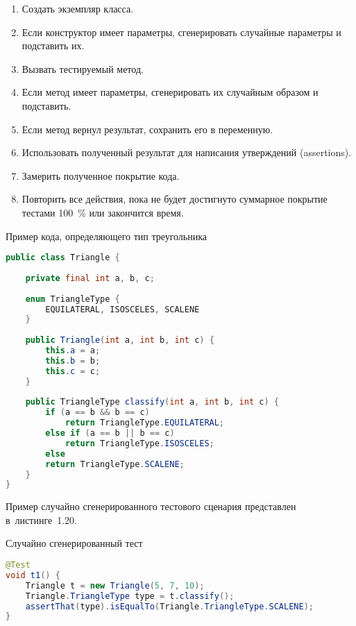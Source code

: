  \begin{enumerate}
 	\item Создать экземпляр класса.
 	\item Если конструктор имеет параметры, сгенерировать случайные параметры и подставить их.
 	\item Вызвать тестируемый метод.
 	\item Если метод имеет параметры, сгенерировать их случайным образом и подставить.
 	\item Если метод вернул результат, сохранить его в переменную.
 	\item Использовать полученный результат для написания утверждений (assertions).
 	\item Замерить полученное покрытие кода.
 	\item Повторить все действия, пока не будет достигнуто суммарное покрытие тестами 100~\% или закончится время.
 \end{enumerate}

\begin{ListingEnv}[!h]%
	\captiondelim{ } %
	\caption{Пример кода, определяющего тип треугольника}
	\begin{lstlisting}[language={Java}]
public class Triangle {
	
	private final int a, b, c;
	
	enum TriangleType {
		EQUILATERAL, ISOSCELES, SCALENE
	}
	
	public Triangle(int a, int b, int c) {
		this.a = a;
		this.b = b;
		this.c = c;
	}
	
	public TriangleType classify(int a, int b, int c) {
		if (a == b && b == c)
			return TriangleType.EQUILATERAL;
		else if (a == b || b == c)
			return TriangleType.ISOSCELES;
		else
		return TriangleType.SCALENE;
	}
}
	\end{lstlisting}
\end{ListingEnv}%


Пример случайно сгенерированного тестового сценария представлен в~листинге~1.20.

\begin{ListingEnv}[!h]%
	\captiondelim{ } %
	\caption{Случайно сгенерированный тест}
	\begin{lstlisting}[language={Java}]
@Test
void t1() {
	Triangle t = new Triangle(5, 7, 10);
	Triangle.TriangleType type = t.classify();
	assertThat(type).isEqualTo(Triangle.TriangleType.SCALENE);
}
	\end{lstlisting}
\end{ListingEnv}%

